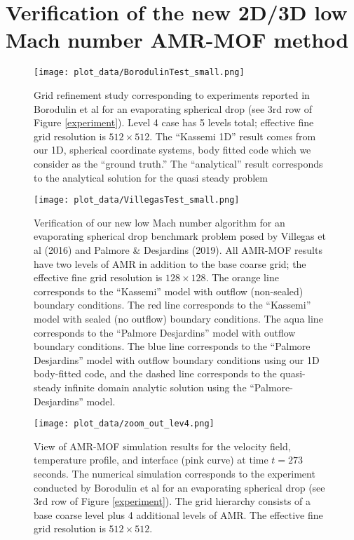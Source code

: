 \documentclass[]{article}
\begin{document}
\section*{Verification of the new 2D/3D low Mach number AMR-MOF method} 

\begin{figure}[h]
\centering
\texttt{[image: plot\_data/BorodulinTest\_small.png]}
\caption*{Grid refinement study corresponding to experiments reported in
 Borodulin et al\cite{BORODULIN2017} for an evaporating spherical
 drop (see 3rd row of Figure \ref{experiment}).  
 Level 4 case has 5 levels total;
 effective fine grid resolution is $512\times 512$.  The ``Kassemi 1D''
 result comes from our 1D, spherical coordinate systems, body fitted code
 which we consider as the ``ground truth.'' The ``analytical''
 result corresponds to the analytical solution for the quasi steady problem }
\end{figure}
\FloatBarrier

\begin{figure}[h]
\centering
\texttt{[image: plot\_data/VillegasTest\_small.png]}
\caption*{Verification of our new low Mach number algorithm for an
 evaporating spherical drop benchmark problem posed by
 Villegas et al (2016)\cite{VILLEGAS2016} and 
 Palmore \& Desjardins (2019)\cite{PALMORE2019}.  
 All AMR-MOF results have two levels of AMR in addition to the base
 coarse grid; the effective fine grid resolution is $128\times 128$.
 The orange line corresponds to the ``Kassemi'' model with outflow (non-sealed)
 boundary conditions. The red line 
 corresponds to the ``Kassemi'' model with sealed (no outflow) 
 boundary conditions.  The aqua line corresponds to the ``Palmore
 Desjardins'' model with outflow boundary conditions.  The
 blue line corresponds to the ``Palmore
 Desjardins'' model with outflow boundary conditions using our 1D 
 body-fitted code, and the dashed line corresponds to the quasi-steady
 infinite domain analytic solution using the ``Palmore-Desjardins''
 model. }
\end{figure}
\FloatBarrier

\begin{figure}[h]
\centering
\texttt{[image: plot\_data/zoom\_out\_lev4.png]}
\caption*{
  View of AMR-MOF simulation results
  for the velocity field, temperature profile, and
  interface (pink curve) at time $t=273$ seconds.   The numerical
  simulation corresponds to the experiment conducted by
  Borodulin et al\cite{BORODULIN2017} for an evaporating spherical
  drop (see 3rd row of Figure \ref{experiment}).  The grid hierarchy consists
  of a base coarse level plus 4 additional levels of AMR.  The effective
  fine grid resolution is $512\times 512$.
  }
\end{figure}
\FloatBarrier
\end{document}

